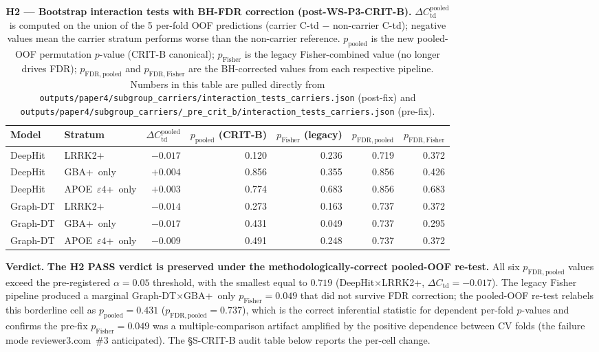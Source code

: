 \documentclass[11pt]{article}
\begin{document}
\begin{table}[h!]
\centering
\caption{\textbf{H2 --- Bootstrap interaction tests with BH-FDR correction (post-WS-P3-CRIT-B).} $\Delta C_\mathrm{td}^{\text{pooled}}$ is computed on the union of the 5 per-fold OOF predictions (carrier C-td $-$ non-carrier C-td); negative values mean the carrier stratum performs worse than the non-carrier reference. $p_\mathrm{pooled}$ is the new pooled-OOF permutation $p$-value (CRIT-B canonical); $p_\mathrm{Fisher}$ is the legacy Fisher-combined value (no longer drives FDR); $p_\mathrm{FDR,pooled}$ and $p_\mathrm{FDR,Fisher}$ are the BH-corrected values from each respective pipeline. Numbers in this table are pulled directly from \texttt{outputs/paper4/subgroup\_carriers/interaction\_tests\_carriers.json} (post-fix) and \texttt{outputs/paper4/subgroup\_carriers/\_pre\_crit\_b/interaction\_tests\_carriers.json} (pre-fix).}
\label{tab:s3_h2_interaction}
\begin{tabular}{llrrrrr}
\toprule
\textbf{Model} & \textbf{Stratum} & \textbf{$\Delta C_\mathrm{td}^{\text{pooled}}$} & \textbf{$p_\mathrm{pooled}$ (CRIT-B)} & \textbf{$p_\mathrm{Fisher}$ (legacy)} & \textbf{$p_\mathrm{FDR,pooled}$} & \textbf{$p_\mathrm{FDR,Fisher}$} \\
\midrule
DeepHit  & LRRK2+              & $-0.017$ & 0.120 & 0.236 & 0.719 & 0.372 \\
DeepHit  & GBA+~only           & $+0.004$ & 0.856 & 0.355 & 0.856 & 0.426 \\
DeepHit  & APOE~$\varepsilon4$+~only & $+0.003$ & 0.774 & 0.683 & 0.856 & 0.683 \\
Graph-DT & LRRK2+              & $-0.014$ & 0.273 & 0.163 & 0.737 & 0.372 \\
Graph-DT & GBA+~only           & $-0.017$ & 0.431 & 0.049 & 0.737 & 0.295 \\
Graph-DT & APOE~$\varepsilon4$+~only & $-0.009$ & 0.491 & 0.248 & 0.737 & 0.372 \\
\bottomrule
\end{tabular}
\end{table}

\noindent\textbf{Verdict.} \textbf{The H2 PASS verdict is preserved under the methodologically-correct pooled-OOF re-test.} All six $p_\mathrm{FDR,pooled}$ values exceed the pre-registered $\alpha{=}0.05$ threshold, with the smallest equal to $0.719$ (DeepHit$\times$LRRK2+, $\Delta C_\mathrm{td}{=}-0.017$). The legacy Fisher pipeline produced a marginal Graph-DT$\times$GBA+~only $p_\mathrm{Fisher}{=}0.049$ that did not survive FDR correction; the pooled-OOF re-test relabels this borderline cell as $p_\mathrm{pooled}{=}0.431$ ($p_\mathrm{FDR,pooled}{=}0.737$), which is the correct inferential statistic for dependent per-fold $p$-values and confirms the pre-fix $p_\mathrm{Fisher}{=}0.049$ was a multiple-comparison artifact amplified by the positive dependence between CV folds (the failure mode reviewer3.com~\#3 anticipated). The §S-CRIT-B audit table below reports the per-cell change.
\end{document}

